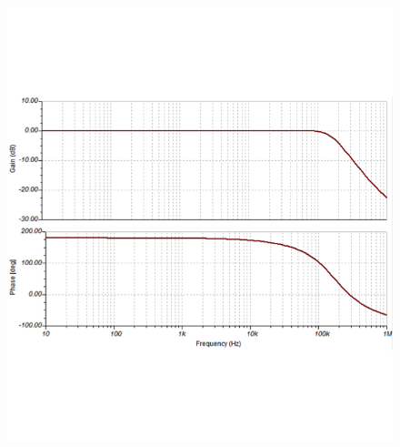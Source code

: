 \begin{frame}
\begin{figure}
\begin{minipage}{0.45\textwidth}
            \includegraphics[width=\textwidth]{fig/Tiefpass_Filter_Freq.png}
        \end{minipage}
    \end{figure}
\end{frame}
